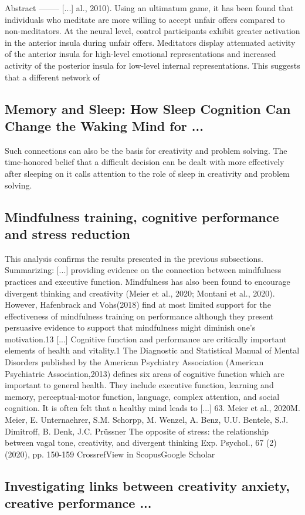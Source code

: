 \documentclass[12pt]{article}
\begin{document}
Abstract
-------- [...] al., 2010). Using an ultimatum game, it has been found that individuals who meditate are more willing to accept unfair offers compared to non-meditators. At the neural level, control participants exhibit greater activation in the anterior insula during unfair offers. Meditators display attenuated activity of the anterior insula for high-level emotional representations and increased activity of the posterior insula for low-level internal representations. This suggests that a different network of\subsection{Memory and Sleep: How Sleep Cognition Can Change the Waking Mind for ...}
Such connections can also be the basis for creativity and problem solving. The time-honored belief that a difficult decision can be dealt with more effectively after sleeping on it calls attention to the role of sleep in creativity and problem solving.\subsection{Mindfulness training, cognitive performance and stress reduction}
This analysis confirms the results presented in the previous subsections. Summarizing: [...] providing evidence on the connection between mindfulness practices and executive function. Mindfulness has also been found to encourage divergent thinking and creativity (Meier et al., 2020; Montani et al., 2020). However, Hafenbrack and Vohs(2018) find at most limited support for the effectiveness of mindfulness training on performance although they present persuasive evidence to support that mindfulness might diminish one's motivation.13 [...] Cognitive function and performance are critically important elements of health and vitality.1 The Diagnostic and Statistical Manual of Mental Disorders published by the American Psychiatry Association (American Psychiatric Association,2013) defines six areas of cognitive function which are important to general health. They include executive function, learning and memory, perceptual-motor function, language, complex attention, and social cognition. It is often felt that a healthy mind leads to [...] 63.   Meier et al., 2020M. Meier, E. Unternaehrer, S.M. Schorpp, M. Wenzel, A. Benz, U.U. Bentele, S.J. Dimitroff, B. Denk, J.C. Prüssner The opposite of stress: the relationship between vagal tone, creativity, and divergent thinking  Exp. Psychol., 67 (2) (2020), pp. 150-159 CrossrefView in ScopusGoogle Scholar\subsection{Investigating links between creativity anxiety, creative performance ...}
\end{document}
